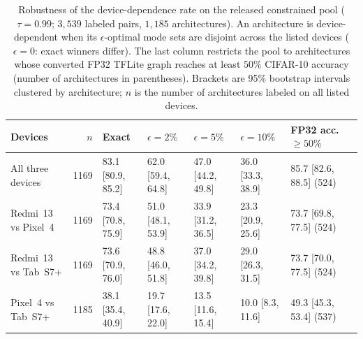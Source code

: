 \begin{table}[!htbp]
\centering
\caption{Robustness of the device-dependence rate on the released constrained
pool ($\tau=0.99$; $3{,}539$ labeled pairs, $1{,}185$ architectures). An architecture
is device-dependent when its $\epsilon$-optimal mode sets are disjoint across
the listed devices ($\epsilon=0$: exact winners differ). The last column
restricts the pool to architectures whose converted FP32 TFLite graph reaches
at least $50\%$ CIFAR-10 accuracy (number of architectures in parentheses).
Brackets are 95\% bootstrap intervals clustered by architecture; $n$ is the
number of architectures labeled on all listed devices.}
\label{tab:robust_extra}
\footnotesize
\setlength{\tabcolsep}{4pt}
\begin{tabular}{@{}lrlllll@{}}
\toprule
\textbf{Devices} & $n$ & \textbf{Exact} & $\epsilon=2\%$ & $\epsilon=5\%$ & $\epsilon=10\%$ & \textbf{FP32 acc.\ $\geq50\%$} \\
\midrule
All three devices & 1169 & 83.1 [80.9,\,85.2] & 62.0 [59.4,\,64.8] & 47.0 [44.2,\,49.8] & 36.0 [33.3,\,38.9] & 85.7 [82.6,\,88.5] (524) \\
Redmi~13 vs Pixel~4 & 1169 & 73.4 [70.8,\,75.9] & 51.0 [48.1,\,53.9] & 33.9 [31.2,\,36.5] & 23.3 [20.9,\,25.6] & 73.7 [69.8,\,77.5] (524) \\
Redmi~13 vs Tab~S7+ & 1169 & 73.6 [70.9,\,76.0] & 48.8 [46.0,\,51.8] & 37.0 [34.2,\,39.8] & 29.0 [26.3,\,31.5] & 73.7 [70.0,\,77.5] (524) \\
Pixel~4 vs Tab~S7+ & 1185 & 38.1 [35.4,\,40.9] & 19.7 [17.6,\,22.0] & 13.5 [11.6,\,15.4] & 10.0 [8.3,\,11.6] & 49.3 [45.3,\,53.4] (537) \\
\bottomrule
\end{tabular}
\end{table}
